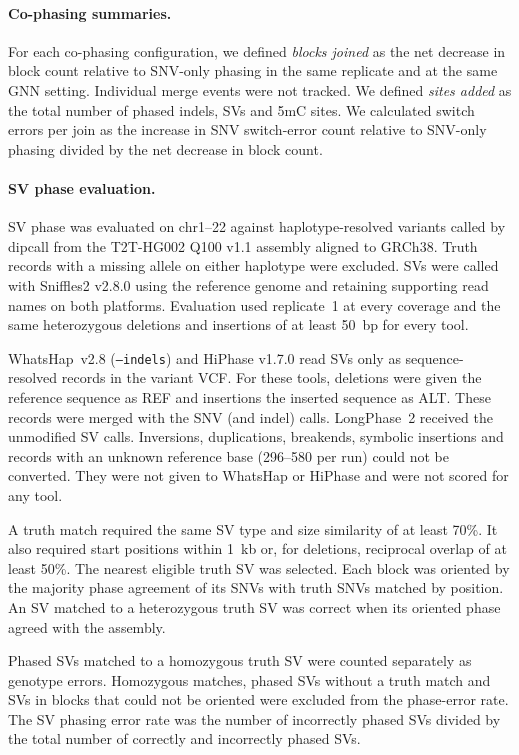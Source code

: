 \documentclass[11pt,a4paper]{article}
\newcommand{\toolname}{LongPhase~2\xspace}
\newcommand{\whatshap}{WhatsHap\xspace}
\begin{document}
\paragraph{Co-phasing summaries.} For each co-phasing configuration, we defined \emph{blocks joined} as the net decrease in block count relative to SNV-only phasing in the same replicate and at the same GNN setting. Individual merge events were not tracked. We defined \emph{sites added} as the total number of phased indels, SVs and 5mC sites. We calculated switch errors per join as the increase in SNV switch-error count relative to SNV-only phasing divided by the net decrease in block count.

\paragraph{SV phase evaluation.} SV phase was evaluated on chr1--22 against haplotype-resolved variants called by dipcall from the T2T-HG002 Q100 v1.1 assembly aligned to GRCh38\cite{li2018dipcall,hansen2026q100}. Truth records with a missing allele on either haplotype were excluded. SVs were called with Sniffles2 v2.8.0 using the reference genome and retaining supporting read names on both platforms. Evaluation used replicate~1 at every coverage and the same heterozygous deletions and insertions of at least 50~bp for every tool.

\whatshap~v2.8 (\texttt{--indels}) and HiPhase v1.7.0 read SVs only as sequence-resolved records in the variant VCF. For these tools, deletions were given the reference sequence as REF and insertions the inserted sequence as ALT. These records were merged with the SNV (and indel) calls. \toolname received the unmodified SV calls. Inversions, duplications, breakends, symbolic insertions and records with an unknown reference base (296--580 per run) could not be converted. They were not given to \whatshap or HiPhase and were not scored for any tool.

A truth match required the same SV type and size similarity of at least 70\%. It also required start positions within 1~kb or, for deletions, reciprocal overlap of at least 50\%. The nearest eligible truth SV was selected. Each block was oriented by the majority phase agreement of its SNVs with truth SNVs matched by position. An SV matched to a heterozygous truth SV was correct when its oriented phase agreed with the assembly.

Phased SVs matched to a homozygous truth SV were counted separately as genotype errors. Homozygous matches, phased SVs without a truth match and SVs in blocks that could not be oriented were excluded from the phase-error rate. The SV phasing error rate was the number of incorrectly phased SVs divided by the total number of correctly and incorrectly phased SVs.
\end{document}
